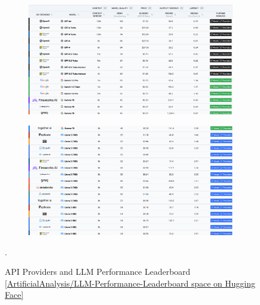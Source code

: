 \begin{figure}[htbp]
    \begin{subfigure}{.97\textwidth}
        \centering
        \includegraphics[width=\linewidth]{./figures/LLM-Perf-P1.png}
    \end{subfigure}
    \begin{subfigure}{.97\textwidth}
        \centering
        \includegraphics[width=\linewidth]{./figures/LLM-Perf-P2.png}
    \end{subfigure}
    \caption{API Providers and LLM Performance Leaderboard \href{https://huggingface.co/spaces/ArtificialAnalysis/LLM-Performance-Leaderboard}{[ArtificialAnalysis/LLM-Performance-Leaderboard space on Hugging Face]}}.
\end{figure}
\newpage


